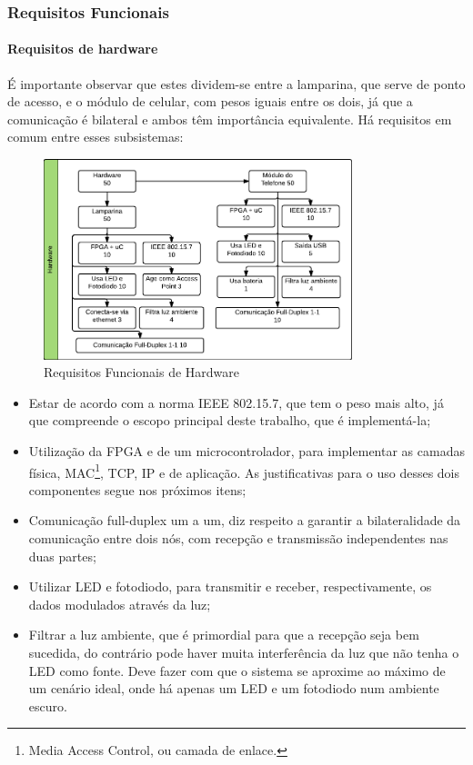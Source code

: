 	\subsubsection{Requisitos Funcionais}\label{subsubsec-requisitos-func}
	
	\paragraph{Requisitos de hardware} 
	
	É importante observar que estes dividem-se entre a lamparina, que serve de ponto de acesso, e o módulo de celular, com pesos iguais entre os dois, já que a comunicação é bilateral e ambos têm importância equivalente. Há requisitos em comum entre esses subsistemas:
	
	\begin{figure}[h!]
		\caption{\label{fig_req1_1} Requisitos Funcionais de Hardware}
		\centering
		\includegraphics[width=0.8\textwidth]{ReqTree1_1.pdf}
	\end{figure}

	\begin{itemize}  
		\item Estar de acordo com a norma IEEE 802.15.7, que tem o peso mais alto, já que compreende o escopo principal deste trabalho, que é implementá-la;
		\item Utilização da FPGA e de um microcontrolador, para implementar as camadas física, MAC\footnote{ Media Access Control, ou camada de enlace.},  TCP, IP e de aplicação. As justificativas para o uso desses dois componentes segue nos próximos itens;
		\item Comunicação full-duplex um a um, diz respeito a garantir a bilateralidade da comunicação entre dois nós, com recepção e transmissão independentes nas duas partes;
		\item Utilizar LED e fotodiodo, para transmitir e receber, respectivamente, os dados modulados através da luz;
		\item Filtrar a luz ambiente, que é primordial para que a recepção seja bem sucedida, do contrário pode haver muita interferência da luz que não tenha o LED como fonte. Deve fazer com que o sistema se aproxime ao máximo de um cenário ideal, onde há apenas um LED e um fotodiodo num ambiente escuro.
	\end{itemize}
	
